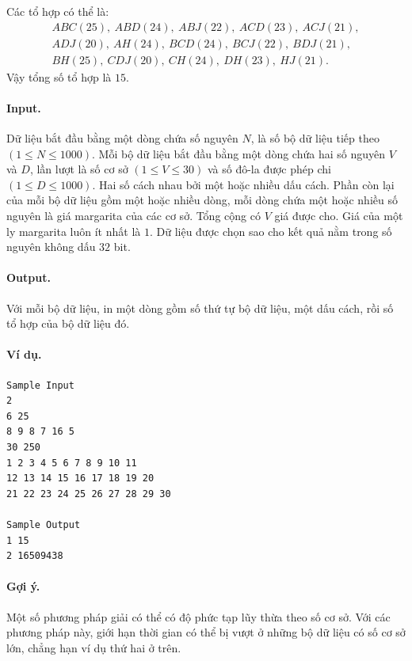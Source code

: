 \documentclass[11pt]{article}
\begin{document}
Các tổ hợp có thể là:
\[
\begin{gathered}
ABC(25),\ ABD(24),\ ABJ(22),\ ACD(23),\ ACJ(21),\\
ADJ(20),\ AH(24),\ BCD(24),\ BCJ(22),\ BDJ(21),\\
BH(25),\ CDJ(20),\ CH(24),\ DH(23),\ HJ(21).
\end{gathered}
\]
Vậy tổng số tổ hợp là \(15\).

\paragraph{Input.}
Dữ liệu bắt đầu bằng một dòng chứa số nguyên \(N\), là số bộ dữ liệu tiếp theo
\((1\le N\le 1000)\). Mỗi bộ dữ liệu bắt đầu bằng một dòng chứa hai số nguyên
\(V\) và \(D\), lần lượt là số cơ sở \((1\le V\le 30)\) và số đô-la được phép
chi \((1\le D\le 1000)\). Hai số cách nhau bởi một hoặc nhiều dấu cách. Phần
còn lại của mỗi bộ dữ liệu gồm một hoặc nhiều dòng, mỗi dòng chứa một hoặc
nhiều số nguyên là giá margarita của các cơ sở. Tổng cộng có \(V\) giá được
cho. Giá của một ly margarita luôn ít nhất là \(1\). Dữ liệu được chọn sao cho
kết quả nằm trong số nguyên không dấu \(32\) bit.

\paragraph{Output.}
Với mỗi bộ dữ liệu, in một dòng gồm số thứ tự bộ dữ liệu, một dấu cách, rồi số
tổ hợp của bộ dữ liệu đó.

\paragraph{Ví dụ.}
\begin{verbatim}
Sample Input
2
6 25
8 9 8 7 16 5
30 250
1 2 3 4 5 6 7 8 9 10 11
12 13 14 15 16 17 18 19 20
21 22 23 24 25 26 27 28 29 30

Sample Output
1 15
2 16509438
\end{verbatim}

\paragraph{Gợi ý.}
Một số phương pháp giải có thể có độ phức tạp lũy thừa theo số cơ sở. Với các
phương pháp này, giới hạn thời gian có thể bị vượt ở những bộ dữ liệu có số cơ
sở lớn, chẳng hạn ví dụ thứ hai ở trên.
\end{document}
